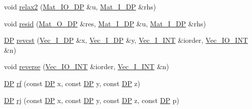 \begin{DoxyCompactItemize}
\item 
void \mbox{\hyperlink{namespaceNR_ab35ff057ba423e15b9661f578781f9fd}{relax2}} (\mbox{\hyperlink{namespaceNR_ad1513aa4697878ed3bff0b8b3c9dd910}{Mat\+\_\+\+I\+O\+\_\+\+DP}} \&u, \mbox{\hyperlink{namespaceNR_a2b8abfda8fffad6ba0a1b5a4c0773dbf}{Mat\+\_\+\+I\+\_\+\+DP}} \&rhs)
\item 
void \mbox{\hyperlink{namespaceNR_adc048600ca2f348d4250703a28fc2a76}{resid}} (\mbox{\hyperlink{namespaceNR_adc1f8da33094b6bbeb1f5f899515ce54}{Mat\+\_\+\+O\+\_\+\+DP}} \&res, \mbox{\hyperlink{namespaceNR_a2b8abfda8fffad6ba0a1b5a4c0773dbf}{Mat\+\_\+\+I\+\_\+\+DP}} \&u, \mbox{\hyperlink{namespaceNR_a2b8abfda8fffad6ba0a1b5a4c0773dbf}{Mat\+\_\+\+I\+\_\+\+DP}} \&rhs)
\item 
\mbox{\hyperlink{namespaceNR_af6ff762dd605ff477b8e52387253a02a}{DP}} \mbox{\hyperlink{namespaceNR_a8d1d9cdfaa0537971775ebcbe41a56eb}{revcst}} (\mbox{\hyperlink{namespaceNR_a9f943da53862537c552e2a770cb170ae}{Vec\+\_\+\+I\+\_\+\+DP}} \&x, \mbox{\hyperlink{namespaceNR_a9f943da53862537c552e2a770cb170ae}{Vec\+\_\+\+I\+\_\+\+DP}} \&y, \mbox{\hyperlink{namespaceNR_ae67ce7dc86a8a64a7ce73c3c030ff610}{Vec\+\_\+\+I\+\_\+\+I\+NT}} \&iorder, \mbox{\hyperlink{namespaceNR_a3b8558419263875cc467f92b0ef4aba7}{Vec\+\_\+\+I\+O\+\_\+\+I\+NT}} \&n)
\item 
void \mbox{\hyperlink{namespaceNR_a76ef747dae58b55d1fe6e2b48cd23af6}{reverse}} (\mbox{\hyperlink{namespaceNR_a3b8558419263875cc467f92b0ef4aba7}{Vec\+\_\+\+I\+O\+\_\+\+I\+NT}} \&iorder, \mbox{\hyperlink{namespaceNR_ae67ce7dc86a8a64a7ce73c3c030ff610}{Vec\+\_\+\+I\+\_\+\+I\+NT}} \&n)
\item 
\mbox{\hyperlink{namespaceNR_af6ff762dd605ff477b8e52387253a02a}{DP}} \mbox{\hyperlink{namespaceNR_a2559b510aaa0c283f2031537b9f23176}{rf}} (const \mbox{\hyperlink{namespaceNR_af6ff762dd605ff477b8e52387253a02a}{DP}} x, const \mbox{\hyperlink{namespaceNR_af6ff762dd605ff477b8e52387253a02a}{DP}} y, const \mbox{\hyperlink{namespaceNR_af6ff762dd605ff477b8e52387253a02a}{DP}} z)
\item 
\mbox{\hyperlink{namespaceNR_af6ff762dd605ff477b8e52387253a02a}{DP}} \mbox{\hyperlink{namespaceNR_ac238786569e5bffe3268ad64d2a45636}{rj}} (const \mbox{\hyperlink{namespaceNR_af6ff762dd605ff477b8e52387253a02a}{DP}} x, const \mbox{\hyperlink{namespaceNR_af6ff762dd605ff477b8e52387253a02a}{DP}} y, const \mbox{\hyperlink{namespaceNR_af6ff762dd605ff477b8e52387253a02a}{DP}} z, const \mbox{\hyperlink{namespaceNR_af6ff762dd605ff477b8e52387253a02a}{DP}} p)
\item 

\end{DoxyCompactItemize}
